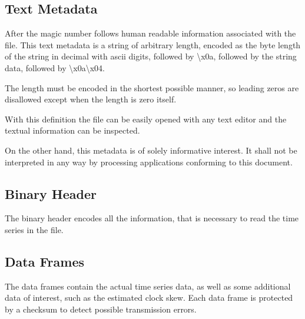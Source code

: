 \documentclass[DIV=10]{scrartcl}
\newcommand{\x}[1]{\textbackslash{}x#1}
\begin{document}
\subsection{Text Metadata}

After the magic number follows human readable information associated with the file.
This text metadata is a string of arbitrary length, encoded as the byte length of the string in decimal with ascii digits, followed by \x{0a}, followed by the string data, followed by \x{0a}\x{04}.

The length must be encoded in the shortest possible manner, so leading zeros are disallowed except when the length is zero itself.

With this definition the file can be easily opened with any text editor and the textual information can be inspected.

On the other hand, this metadata is of solely informative interest.
It shall not be interpreted in any way by processing applications conforming to this document.

\subsection{Binary Header}

The binary header encodes all the information, that is necessary to read the time series in the file.

\subsection{Data Frames}

The data frames contain the actual time series data, as well as some additional data of interest, such as the estimated clock skew.
Each data frame is protected by a checksum to detect possible transmission errors.
\end{document}
